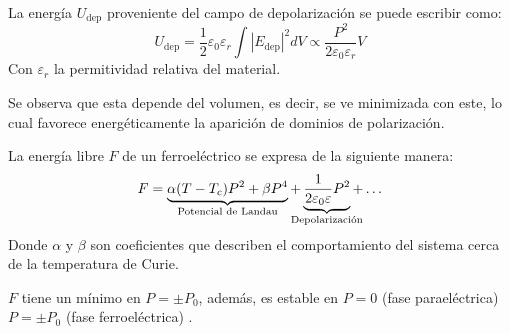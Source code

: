 \documentclass[../main.tex]{subfiles}
\begin{document}
La energía $U_\text{dep}$ proveniente del campo de depolarización se puede escribir como:
\begin{equation}
    U_\text{dep}=\dfrac{1}{2}\varepsilon_0\varepsilon_r\int|E_\text{dep}|^2dV\propto\dfrac{P^2}{2\varepsilon_0\varepsilon_r}V
    \label{eq:energiadepolarizacion}
\end{equation}
Con $\varepsilon_r$ la permitividad relativa del material.

Se observa que esta depende del volumen, es decir, se ve minimizada con este, lo cual favorece energéticamente la aparición de dominios de polarización.

La energía libre $F$ de un ferroeléctrico se expresa de la siguiente manera:
\begin{equation}
    F=\underbrace{\alpha(T-T_c)P^2+\beta P^4}_\text{\clap{Potencial de Landau}}+\underbrace{\dfrac{1}{2\varepsilon_0\varepsilon}P^2}_\text{\clap{Depolarización}}+\dots
    \label{eq:energíalibre}
\end{equation}
Donde $\alpha$ y $\beta$ son coeficientes que describen el comportamiento del sistema cerca de la temperatura de Curie.

$F$ tiene un mínimo en $P=\pm P_{0}$, además, es estable en $P=0$ (fase paraeléctrica) $P=\pm P_{0}$ (fase ferroeléctrica) \cite{Landau1984}.
\end{document}

